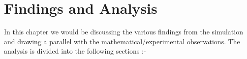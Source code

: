 \chapter*{Findings and Analysis}

In this chapter we would be discussing the various findings from the simulation and drawing a parallel with the mathematical/experimental observations. The analysis is divided into the following sections :-

\newpage\cleardoublepage

